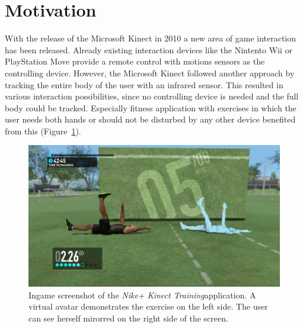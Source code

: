 \section{Motivation}
With the release of the Microsoft Kinect in 2010 a new area of game interaction has been released.
Already existing interaction devices like the Nintento Wii or PlayStation Move provide a remote control with motions sensors as the controlling device.
However, the Microsoft Kinect followed another approach by tracking the entire body of the user with an infrared sensor.
This resulted in various interaction possibilities, since no controlling device is needed and the full body could be tracked.
Especially fitness application with exercises in which the user needs both hands or should not be disturbed by any other device benefited from this (Figure~\ref{fig:1_kinectSports}).
\begin{figure}[htb]
	\centering
	\begin{minipage}[t]{1\linewidth}
		\centering
		\includegraphics[width=0.55\linewidth]{Pictures/1_nikePlusKinect2}
		\caption{Ingame screenshot of the \textit{Nike+ Kinect Training}\protect\footnotemark application. A virtual avatar demonstrates the exercise on the left side. The user can see herself mirorred on the right side of the screen.}
		\label{fig:1_kinectSports}
	\end{minipage}
\end{figure}

